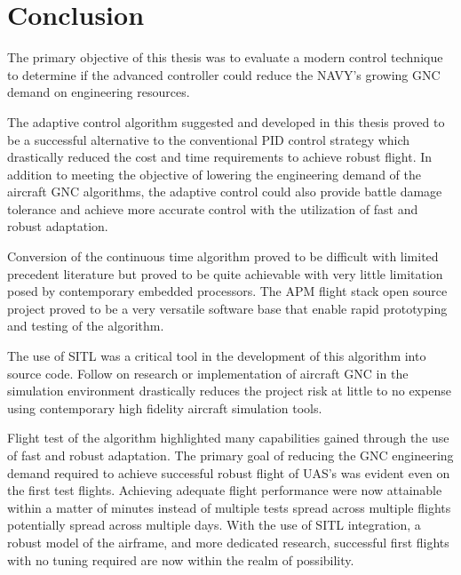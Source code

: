 \chapter{Conclusion}\label{ch:conclusion}

The primary objective of this thesis was to evaluate a modern control technique to determine if the advanced controller could reduce the NAVY's growing \ac{GNC} demand on engineering resources.  

The \Lone adaptive control algorithm suggested and developed in this thesis proved to be a successful alternative to the conventional \ac{PID} control strategy which drastically reduced the cost and time requirements to achieve robust flight.  In addition to meeting the objective of lowering the engineering demand of the aircraft \ac{GNC} algorithms, the \Lone adaptive control could also provide battle damage tolerance and achieve more accurate control with the utilization of fast and robust adaptation.

Conversion of the continuous time \Lone algorithm proved to be difficult with limited precedent literature but proved to be quite achievable with very little limitation posed by contemporary embedded processors.  The \ac{APM} flight stack open source project proved to be a very versatile software base that enable rapid prototyping and testing of the \Lone algorithm.  

The use of \ac{SITL} was a critical tool in the development of this algorithm into source code.  Follow on research or implementation of aircraft \ac{GNC} in the simulation environment drastically reduces the project risk at little to no expense using contemporary high fidelity aircraft simulation tools.

Flight test of the \Lone algorithm highlighted many capabilities gained through the use of fast and robust adaptation.  The primary goal of reducing the \ac{GNC} engineering demand required to achieve successful robust flight of \ac{UAS}'s was evident even on the first test flights.  Achieving adequate flight performance were now attainable within a matter of minutes instead of multiple tests spread across multiple flights potentially spread across multiple days.  With the use of \ac{SITL} integration, a robust model of the airframe, and more dedicated research, successful first flights with no tuning required are now within the realm of possibility.




